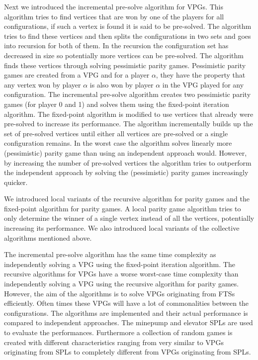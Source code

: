 Next we introduced the incremental pre-solve algorithm for VPGs. This algorithm tries to find vertices that are won by one of the players for all configurations, if such a vertex is found it is said to be pre-solved. The algorithm tries to find these vertices and then splits the configurations in two sets and goes into recursion for both of them. In the recursion the configuration set has decreased in size so potentially more vertices can be pre-solved. The algorithm finds these vertices through solving pessimistic parity games. Pessimistic parity games are created from a VPG and for a player $\alpha$, they have the property that any vertex won by player $\alpha$ is also won by player $\alpha$ in the VPG played for any configuration. The incremental pre-solve algorithm creates two pessimistic parity games (for player 0 and 1) and solves them using the fixed-point iteration algorithm. The fixed-point algorithm is modified to use vertices that already were pre-solved to increase its performance. The algorithm incrementally builds up the set of pre-solved vertices until either all vertices are pre-solved or a single configuration remains. In the worst case the algorithm solves linearly more (pessimistic) parity game than using an independent approach would. However, by increasing the number of pre-solved vertices the algorithm tries to outperform the independent approach by solving the (pessimistic) parity games increasingly quicker.

We introduced local variants of the recursive algorithm for parity games and the fixed-point algorithm for parity games. A local parity game algorithm tries to only determine the winner of a single vertex instead of all the vertices, potentially increasing its performance. We also introduced local variants of the collective algorithms mentioned above.

The incremental pre-solve algorithm has the same time complexity as independently solving a VPG using the fixed-point iteration algorithm. The recursive algorithms for VPGs have a worse worst-case time complexity than independently solving a VPG using the recursive algorithm for parity games. However, the aim of the algorithms is to solve VPGs originating from FTSs efficiently. Often times these VPGs will have a lot of commonalities between the configurations. The algorithms are implemented and their actual performance is compared to independent approaches. The minepump and elevator SPLs are used to evaluate the performances. Furthermore a collection of random games is created with different characteristics ranging from very similar to VPGs originating from SPLs to completely different from VPGs originating from SPLs.

